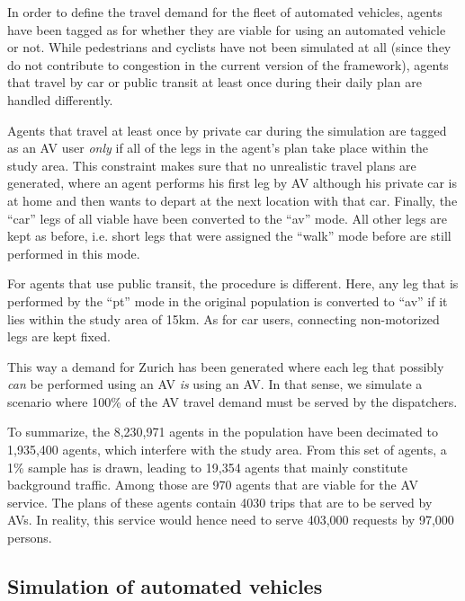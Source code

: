 In order to define the travel demand for the fleet of automated vehicles, agents have been tagged as for whether they are viable for using an automated vehicle or not.
While pedestrians and cyclists have not been simulated at all (since they do not contribute to congestion in the current version of the framework), agents that travel by car or public transit at least once during their daily plan are handled differently.

Agents that travel at least once by private car during the simulation are tagged as an AV user \textit{only} if all of the legs in the agent's plan take place within the study area. This constraint makes sure that no unrealistic travel plans are generated, where an agent performs his first leg by AV although his private car is at home and then wants to depart at the next location with that car. Finally, the ``car'' legs of all viable have been converted to the ``av'' mode.
All other legs are kept as before, i.e. short legs that were assigned the ``walk'' mode before are still performed in this mode.

For agents that use public transit, the procedure is different. Here, any leg that is performed by the ``pt'' mode in the original population is converted to ``av'' if it lies within the study area of 15km. As for car users, connecting non-motorized legs are kept fixed.

This way a demand for Zurich has been generated where each leg that possibly \textit{can} be performed using an AV \textit{is} using an AV. In that sense, we simulate a scenario where 100\% of the AV travel demand must be served by the dispatchers.

To summarize, the 8,230,971 agents in the population have been decimated to 1,935,400 agents, which interfere with the study area. From this set of agents, a 1\% sample has is drawn, leading to 19,354 agents that mainly constitute background traffic. Among those are 970 agents that are viable for the AV service. The plans of these agents contain 4030 trips that are to be served by AVs. In reality, this service would hence need to serve 403,000 requests by 97,000 persons.

\subsection{Simulation of automated vehicles}

